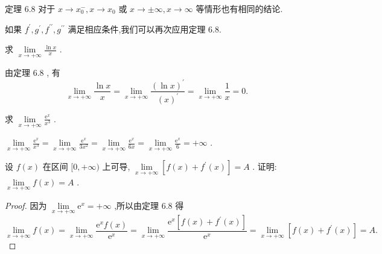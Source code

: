 定理 6.8 对于 \(x \rightarrow  {x}_{0}^{ - },x \rightarrow  {x}_{0}\) 或 \(x \rightarrow   \pm  \infty ,x \rightarrow  \infty\) 等情形也有相同的结论.

如果 \({f}^{\prime },{g}^{\prime },{f}^{\prime \prime },{g}^{\prime \prime }\) 满足相应条件,我们可以再次应用定理 6.8.

\begin{example}
求 \(\mathop{\lim }\limits_{{x \rightarrow   + \infty }}\frac{\ln x}{x}\) .
\end{example}


\begin{solution}
由定理 6.8 , 有
\[
\mathop{\lim }\limits_{{x \rightarrow   + \infty }}\frac{\ln x}{x} = \mathop{\lim }\limits_{{x \rightarrow   + \infty }}\frac{{\left( \ln x\right) }^{\prime }}{{\left( x\right) }^{\prime }} = \mathop{\lim }\limits_{{x \rightarrow   + \infty }}\frac{1}{x} = 0.
\]
\end{solution}

\begin{example}
求 \(\mathop{\lim }\limits_{{x \rightarrow   + \infty }}\frac{{\mathrm{e}}^{x}}{{x}^{3}}\) .
\end{example}


\begin{solution}
\(\mathop{\lim }\limits_{{x \rightarrow   + \infty }}\frac{{\mathrm{e}}^{x}}{{x}^{3}} = \mathop{\lim }\limits_{{x \rightarrow   + \infty }}\frac{{\mathrm{e}}^{x}}{3{x}^{2}} = \mathop{\lim }\limits_{{x \rightarrow   + \infty }}\frac{{\mathrm{e}}^{x}}{6x} = \mathop{\lim }\limits_{{x \rightarrow   + \infty }}\frac{{\mathrm{e}}^{x}}{6} =  + \infty\) .
\end{solution}


\begin{example}
设 \(f\left( x\right)\) 在区间 \(\lbrack 0, + \infty )\) 上可导, \(\mathop{\lim }\limits_{{x \rightarrow   + \infty }}\left\lbrack  {f\left( x\right)  + {f}^{\prime }\left( x\right) }\right\rbrack   = A\) . 证明: \(\mathop{\lim }\limits_{{x \rightarrow   + \infty }}f\left( x\right)  = A\) .
\end{example}


\begin{proof}
因为 \(\mathop{\lim }\limits_{{x \rightarrow   + \infty }}{\mathrm{e}}^{x} =  + \infty\) ,所以由定理 6.8 得
\[
\mathop{\lim }\limits_{{x \rightarrow   + \infty }}f\left( x\right)  = \mathop{\lim }\limits_{{x \rightarrow   + \infty }}\frac{{\mathrm{e}}^{x}f\left( x\right) }{{\mathrm{e}}^{x}} = \mathop{\lim }\limits_{{x \rightarrow   + \infty }}\frac{{\mathrm{e}}^{x}\left\lbrack  {f\left( x\right)  + {f}^{\prime }\left( x\right) }\right\rbrack  }{{\mathrm{e}}^{x}} = \mathop{\lim }\limits_{{x \rightarrow   + \infty }}\left\lbrack  {f\left( x\right)  + {f}^{\prime }\left( x\right) }\right\rbrack   = A.
\]
\end{proof}

